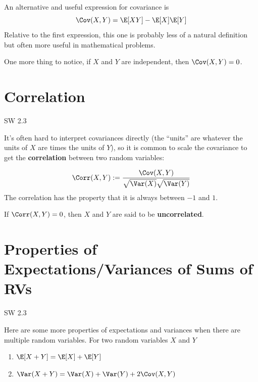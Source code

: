 \documentclass[
  letterpaper,
  DIV=11,
  numbers=noendperiod]{scrreprt}
\begin{document}
An alternative and useful expression for covariance is \[
  \Cov(X,Y) = \E[XY] - \E[X]\E[Y]
\] Relative to the first expression, this one is probably less of a
natural definition but often more useful in mathematical problems.

One more thing to notice, if \(X\) and \(Y\) are independent, then
\(\Cov(X,Y) = 0\).

\section{Correlation}\label{correlation}

SW 2.3

It's often hard to interpret covariances directly (the ``units'' are
whatever the units of \(X\) are times the units of \(Y\)), so it is
common to scale the covariance to get the \textbf{correlation} between
two random variables:

\[
  \Corr(X,Y) := \frac{\Cov(X,Y)}{\sqrt{\Var(X)} \sqrt{\Var(Y)}}
\] The correlation has the property that it is always between \(-1\) and
\(1\).

If \(\Corr(X,Y) = 0\), then \(X\) and \(Y\) are said to be
\textbf{uncorrelated}.

\section{Properties of Expectations/Variances of Sums of
RVs}\label{properties-of-expectationsvariances-of-sums-of-rvs}

SW 2.3

Here are some more properties of expectations and variances when there
are multiple random variables. For two random variables \(X\) and \(Y\)

\begin{enumerate}
\def\labelenumi{\arabic{enumi}.}
\item
  \(\E[X+Y] = \E[X] + \E[Y]\)
\item
  \(\Var(X+Y) = \Var(X) + \Var(Y) + 2\Cov(X,Y)\)
\end{enumerate}
\end{document}
